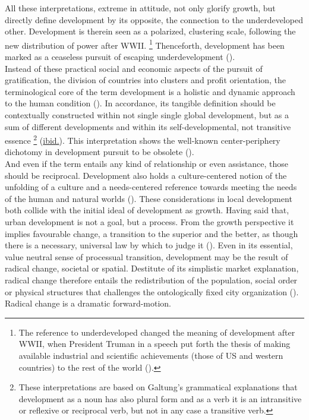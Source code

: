 \documentclass[11pt]{report}
\begin{document}
{{All these interpretations, extreme in attitude, not only glorify growth, but directly define development by its opposite, the connection to the underdeveloped other. Development is therein seen as a polarized, clustering scale, following the new distribution of power after WWII. 
\footnote{The reference to underdeveloped changed the meaning of development after WWII, when President Truman in a speech put forth the thesis of making available industrial and scientific achievements (those of US and western countries) to the rest of the world (\href{Esteva}{\citealt{esteva_development_2010}}).}
Thenceforth, development has been marked as a ceaseless pursuit of escaping underdevelopment (\href{Esteva}{\citealt{esteva_development_2010}}).
\\

Instead of these practical social and economic aspects of the pursuit of gratification, the division of countries into clusters and profit orientation, the terminological core of the term development is a holistic and dynamic approach to the human condition (\href{Galtung}{\citealt{galtung_peace_1996}}). 
In accordance, its tangible definition should be contextually constructed within not single single global development, but as a sum of different developments and within its self-developmental, not transitive essence
\footnote{These interpretations are based on Galtung's grammatical explanations that development as a noun has also plural form and as a verb it is an intransitive or reflexive or reciprocal verb, but not in any case a transitive verb.}
(\href{Galtung}{ibid.}).
This interpretation shows the well-known center-periphery dichotomy in development pursuit to be obsolete  (\href{Robinson}{\citealt{robinson_ordinary_2006}}).
\\

And even if the term entails any kind of relationship or even assistance, those should be reciprocal. Development also holds a culture-centered notion of the unfolding of a culture and a needs-centered reference towards meeting the needs of the human and natural worlds  (\href{Galtung}{\citealt{galtung_peace_1996}}).
These considerations in local development both collide with the initial ideal of development as growth. Having said that, urban development is not a goal, but a process. From the growth perspective it implies favourable change, a transition to the superior and the better, as though there is a necessary, universal law by which to judge it (\href{Esteva}{\citealt{esteva_development_2010}}).
Even in its essential, value neutral sense of processual transition, development may be the result of radical change, societal or spatial.
Destitute of its simplistic market explanation, radical change therefore entails the redistribution of the population, social order or physical structures that challenges the ontologically fixed city organization (\href{Brenner}{\citealt{brenner_urban_2014}}).
Radical change is a dramatic forward-motion.
\\

}}
\end{document}
